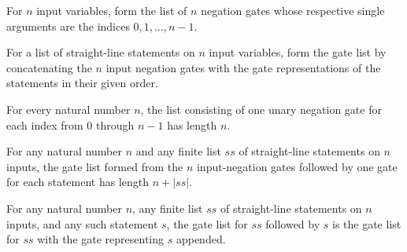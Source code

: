 \begin{definition}
\label{BoolCircuit.StraightLine.negGates}
\leanok
{}
For $n$ input variables, form the list of $n$ negation gates whose respective single
arguments are the indices $0,1,\ldots,n-1$.
\end{definition}

\begin{definition}
\label{BoolCircuit.StraightLine.slpGates}
\leanok
{}
For a list of straight-line statements on $n$ input variables, form the gate list by
concatenating the $n$ input negation gates with the gate representations of the
statements in their given order.
\end{definition}

\begin{theorem}
\label{BoolCircuit.StraightLine.length_negGates}
\leanok
{}
For every natural number $n$, the list consisting of one unary negation gate for each
index from $0$ through $n-1$ has length $n$.
\end{theorem}

\begin{theorem}
\label{BoolCircuit.StraightLine.length_slpGates}
\leanok
{}
For any natural number $n$ and any finite list $ss$ of straight-line statements on $n$
inputs, the gate list formed from the $n$ input-negation gates followed by one gate for
each statement has length $n+|ss|$.
\end{theorem}

\begin{theorem}
\label{BoolCircuit.StraightLine.slpGates_snoc}
\leanok
{}
For any natural number $n$, any finite list $ss$ of straight-line statements on $n$
inputs, and any such statement $s$, the gate list for $ss$ followed by $s$ is the gate
list for $ss$ with the gate representing $s$ appended.
\end{theorem}

